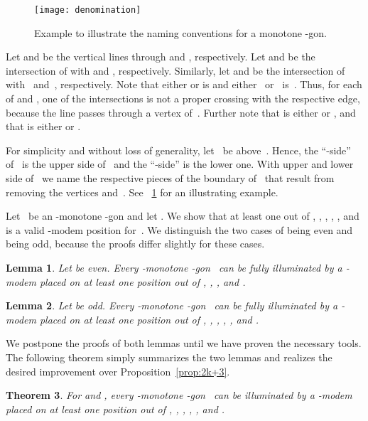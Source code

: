 \documentclass[A4]{article}
\newtheorem{theorem}{Theorem}
\newtheorem{lemma}[theorem]{Lemma}
\begin{document}
\begin{figure}[htb]
  \centering
  \texttt{[image: denomination]}
  \caption{Example to illustrate the naming conventions for a monotone -gon.}
  \label{fig:naming_convention}
\end{figure}

Let  and  be the vertical lines through  and , respectively.
Let  and  be the intersection of  with  and , respectively.
Similarly, let  and  be the intersection of  with~ and~, respectively.
Note that either  or  is  and either~ or~ is~.
Thus, for each of  and , one of the intersections is not a proper crossing with the respective edge, because the line passes through a vertex of~.
Further note that  is either  or , and that  is either  or .

For simplicity and without loss of generality, let~ be above~.
Hence, the ``-side'' of~ is the upper side of~ and the ``-side'' is the lower one.
With upper and lower side of~ we name the respective pieces of the boundary of~ that result from removing the vertices  and~.
See \figurename~\ref{fig:naming_convention} for an illustrating example.


Let~ be an -monotone -gon and let .
We show that at least one out of , , , , , and  is a valid \mbox{-modem} position for~.
We distinguish the two cases of  being even and  being odd, because the proofs differ slightly for these cases.


\begin{lemma}\label{lem:2k+5even}
Let  be even.
Every -monotone -gon~ can be fully illuminated by a \mbox{-modem} placed on at least one position out of , , , and .
\end{lemma}


\begin{lemma}\label{lem:2k+5odd}
Let  be odd.
Every -monotone -gon~ can be fully illuminated by a \mbox{-modem} placed on at least one position out of , , , , , and .
\end{lemma}

We postpone the proofs of both lemmas until we have proven the necessary tools.
The following theorem simply summarizes the two lemmas and realizes the desired improvement over Proposition~\ref{prop:2k+3}.

\begin{theorem}\label{thm:2k+5}
For  and , every -monotone -gon~ can be illuminated by a \mbox{-modem} placed on at least one position out of , , , , , and .
\end{theorem}
\end{document}
